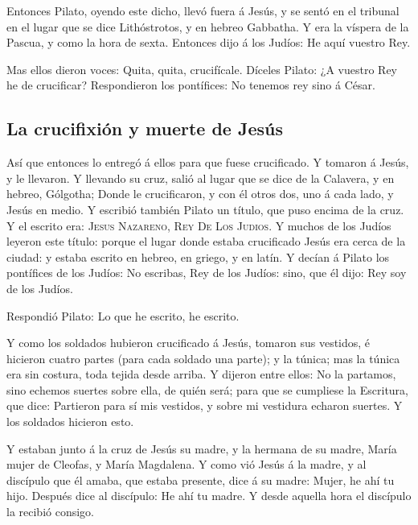  Entonces Pilato, oyendo este dicho, llevó fuera á Jesús,
y se sentó en el tribunal en el lugar que se dice Lithóstrotos, y en
hebreo Gabbatha.  Y era la víspera de la Pascua, y como
la hora de sexta. Entonces dijo á los Judíos: He aquí vuestro Rey.

 Mas ellos dieron voces: Quita, quita, crucifícale.
Díceles Pilato: ¿A vuestro Rey he de crucificar? Respondieron los
pontífices: No tenemos rey sino á César.

\hypertarget{la-crucifixiuxf3n-y-muerte-de-jesuxfas}{%
\subsection{La crucifixión y muerte de
Jesús}\label{la-crucifixiuxf3n-y-muerte-de-jesuxfas}}

 Así que entonces lo entregó á ellos para que fuese
crucificado. Y tomaron á Jesús, y le llevaron.  Y
llevando su cruz, salió al lugar que se dice de la Calavera, y en
hebreo, Gólgotha;  Donde le crucificaron, y con él otros
dos, uno á cada lado, y Jesús en medio.  Y escribió
también Pilato un título, que puso encima de la cruz. Y el escrito era:
\textsc{Jesus} \textsc{Nazareno}, \textsc{Rey} \textsc{De} \textsc{Los}
\textsc{Judios}.  Y muchos de los Judíos leyeron este
título: porque el lugar donde estaba crucificado Jesús era cerca de la
ciudad: y estaba escrito en hebreo, en griego, y en latín.
 Y decían á Pilato los pontífices de los Judíos: No
escribas, Rey de los Judíos: sino, que él dijo: Rey soy de los Judíos.

 Respondió Pilato: Lo que he escrito, he escrito.

 Y como los soldados hubieron crucificado á Jesús,
tomaron sus vestidos, é hicieron cuatro partes (para cada soldado una
parte); y la túnica; mas la túnica era sin costura, toda tejida desde
arriba.  Y dijeron entre ellos: No la partamos, sino
echemos suertes sobre ella, de quién será; para que se cumpliese la
Escritura, que dice: Partieron para sí mis vestidos, y sobre mi
vestidura echaron suertes. Y los soldados hicieron esto.

 Y estaban junto á la cruz de Jesús su madre, y la
hermana de su madre, María mujer de Cleofas, y María Magdalena.
 Y como vió Jesús á la madre, y al discípulo que él
amaba, que estaba presente, dice á su madre: Mujer, he ahí tu hijo.
 Después dice al discípulo: He ahí tu madre. Y desde
aquella hora el discípulo la recibió consigo.

